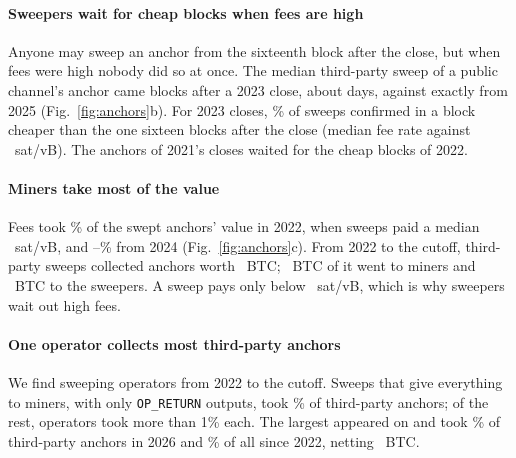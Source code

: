 \paragraph{Sweepers wait for cheap blocks when fees are high}
Anyone may sweep an anchor from the sixteenth block after the close, but when fees were high nobody did so at once. The
median third-party sweep of a public channel's anchor came \ThirdMedDelayTwentyThree{} blocks after a 2023 close,
about \ThirdMedDelayDaysTwentyThree{} days, against exactly \ThirdMedDelayTwentyFive{} from 2025 (Fig.~\ref{fig:anchors}b). For 2023 closes,
\SweepCheaperPctTwentyThree\% of sweeps confirmed in a block cheaper than the one sixteen blocks after the close
(median fee rate \SweepPFiftyAtSweepTwentyThree{} against \SweepPFiftyAtSixteenTwentyThree~sat/vB). The anchors of
2021's closes waited for the cheap blocks of 2022.

\paragraph{Miners take most of the value}
Fees took \MinersShareTwentyTwo\% of the swept anchors' value in 2022, when sweeps paid a median
\SweepMedFrTwentyTwo~sat/vB, and \MinersShareLateMin--\MinersShareLateMax\% from 2024 (Fig.~\ref{fig:anchors}c). From 2022 to the cutoff,
third-party sweeps collected anchors worth \SweepValueBtc~BTC; \SweepMinersBtc~BTC of it went to miners and
\SweepSweepersBtc~BTC to the sweepers. A sweep pays only below \BreakEven~sat/vB, which is why sweepers
wait out high fees.

\paragraph{One operator collects most third-party anchors}
We find \SweepOperators{} sweeping operators from 2022 to the cutoff. Sweeps that give everything to miners, with only
\texttt{OP\_RETURN} outputs, took \SweepBurnPct\% of third-party anchors; of the rest, \SweepOperatorsOverOne{}
operators took more than 1\% each. The largest appeared on \SweepLargestFirst{} and took \SweepLargestPctTwentySix\%
of third-party anchors in 2026 and \SweepLargestPct\% of all since 2022, netting \SweepLargestNetBtc~BTC.

